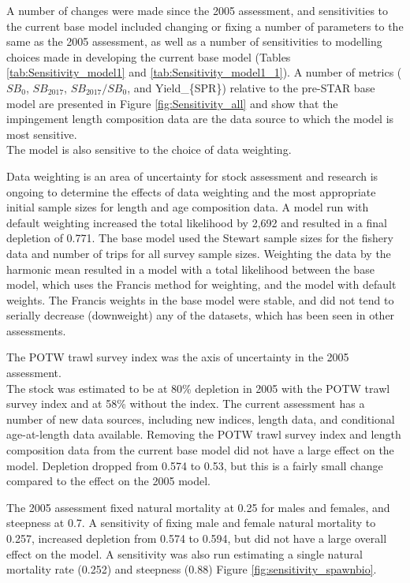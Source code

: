\documentclass[12pt,]{article}
\begin{document}
A number of changes were made since the 2005 assessment, and
sensitivities to the current base model included changing or fixing a
number of parameters to the same as the 2005 assessment, as well as a
number of sensitivities to modelling choices made in developing the
current base model (Tables \ref{tab:Sensitivity_model1} and
\ref{tab:Sensitivity_model1_1}). A number of metrics (\(SB_0\),
\(SB_{2017}\), \(SB_{2017}/SB_0\), and Yield\_\{SPR\}) relative to the
pre-STAR base model are presented in Figure \ref{fig:Sensitivity_all}
and show that the impingement length composition data are the data
source to which the model is most sensitive.\\
The model is also sensitive to the choice of data weighting.

Data weighting is an area of uncertainty for stock assessment and
research is ongoing to determine the effects of data weighting and the
most appropriate initial sample sizes for length and age composition
data. A model run with default weighting increased the total likelihood
by 2,692 and resulted in a final depletion of 0.771. The base model used
the Stewart sample sizes for the fishery data and number of trips for
all survey sample sizes. Weighting the data by the harmonic mean
resulted in a model with a total likelihood between the base model,
which uses the Francis method for weighting, and the model with default
weights. The Francis weights in the base model were stable, and did not
tend to serially decrease (downweight) any of the datasets, which has
been seen in other assessments.

The POTW trawl survey index was the axis of uncertainty in the 2005
assessment.\\
The stock was estimated to be at 80\% depletion in 2005 with the POTW
trawl survey index and at 58\% without the index. The current assessment
has a number of new data sources, including new indices, length data,
and conditional age-at-length data available. Removing the POTW trawl
survey index and length composition data from the current base model did
not have a large effect on the model. Depletion dropped from 0.574 to
0.53, but this is a fairly small change compared to the effect on the
2005 model.

The 2005 assessment fixed natural mortality at 0.25 for males and
females, and steepness at 0.7. A sensitivity of fixing male and female
natural mortality to 0.257, increased depletion from 0.574 to 0.594, but
did not have a large overall effect on the model. A sensitivity was also
run estimating a single natural mortality rate (0.252) and steepness
(0.88) Figure \ref{fig:sensitivity_spawnbio}.
\end{document}
